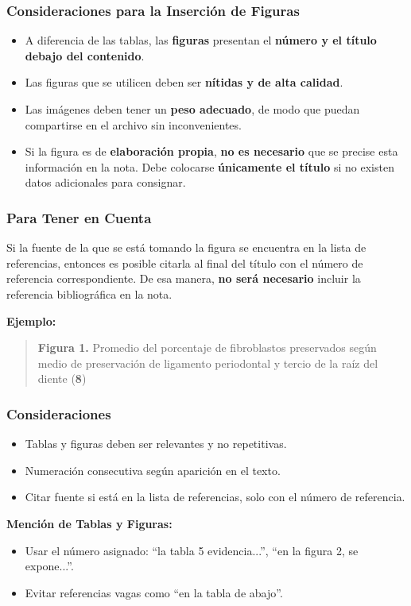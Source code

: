 \documentclass[
11pt, %
]{beamer}
\begin{document}
\begin{frame}
	\frametitle{Consideraciones para la Inserción de Figuras}

	\begin{itemize}
		\item A diferencia de las tablas, las \textbf{figuras} presentan el \textbf{número y el título} \textbf{debajo del contenido}.
		\item Las figuras que se utilicen deben ser \textbf{nítidas y de alta calidad}.
		\item Las imágenes deben tener un \textbf{peso adecuado}, de modo que puedan compartirse en el archivo sin inconvenientes.
		\item Si la figura es de \textbf{elaboración propia}, \textbf{no es necesario} que se precise esta información en la nota. Debe colocarse \textbf{únicamente el título} si no existen datos adicionales para consignar.
	\end{itemize}

\end{frame}

\begin{frame}
	\frametitle{Para Tener en Cuenta}

	Si la fuente de la que se está tomando la figura se encuentra en la lista de referencias, entonces es posible citarla al final del título con el número de referencia correspondiente. De esa manera, \textbf{no será necesario} incluir la referencia bibliográfica en la nota.

	\textbf{Ejemplo:}

	\begin{quote}
		\textbf{Figura 1.} Promedio del porcentaje de fibroblastos preservados según medio de preservación de ligamento periodontal y tercio de la raíz del diente (\textbf{8})
	\end{quote}

\end{frame}

\begin{frame}
	\frametitle{Consideraciones}

	\begin{itemize}
		\item Tablas y figuras deben ser relevantes y no repetitivas.
		\item Numeración consecutiva según aparición en el texto.
		\item Citar fuente si está en la lista de referencias, solo con el número de referencia.
	\end{itemize}

	\textbf{Mención de Tablas y Figuras:}
	\begin{itemize}
		\item Usar el número asignado: “la tabla 5 evidencia...”, “en la figura 2, se expone...”.
		\item Evitar referencias vagas como “en la tabla de abajo”.
	\end{itemize}

\end{frame}
\end{document}
